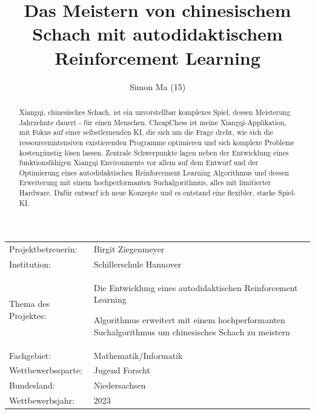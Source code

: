 \documentclass[
  manuscript=article,  %
  layout=publish,  %
  year=2023,
  volume=1,
]{extra/joas}
\title{Das Meistern von chinesischem Schach mit autodidaktischem Reinforcement Learning}
\author{Simon Ma (15)}
\affiliation{Schillerschule Hannover, Ebellstr. 15, 30629 Hannover, Germany}
\begin{document}
\begin{abstract}
    Xiangqi, chinesisches Schach, ist ein unvorstellbar komplexes Spiel, dessen Meisterung Jahrzehnte dauert - für einen Menschen. CheapChess ist meine Xiangqi-Applikation, mit Fokus auf einer selbstlernenden KI, die sich um die Frage dreht, wie sich die ressourcenintensiven existierenden Programme optimieren und sich komplexe Probleme kostengünstig lösen lassen. Zentrale Schwerpunkte lagen neben der Entwicklung eines funktionsfähigen Xiangqi Environments vor allem auf dem Entwurf und der Optimierung eines autodidaktischen Reinforcement Learning Algorithmus und dessen Erweiterung mit einem hochperformanten Suchalgorithmus, alles mit limitierter Hardware. Dafür entwarf ich neue Konzepte und es entstand eine flexibler, starke Spiel-KI.
\end{abstract}

\begin{tabular}{l p{12cm}}

    Projektbetreuerin: & Birgit Ziegenmeyer                                                    \\

    Institution:       & Schillerschule Hannover                                               \\

    Thema des Projektes:
                       & Die Entwicklung eines autodidaktischen Reinforcement Learning 

    Algorithmus erweitert mit einem hochperformanten Suchalgorithmus um chinesisches Schach 
    zu meistern                                                                                \\

    Fachgebiet:        & Mathematik/Informatik                                                 \\

    Wettbewerbssparte: & Jugend Forscht                                                        \\

    Bundesland:        & Niedersachsen                                                         \\

    Wettbewerbsjahr:   & 2023                                                                  \\
\end{tabular}

\newpage
\end{document}
